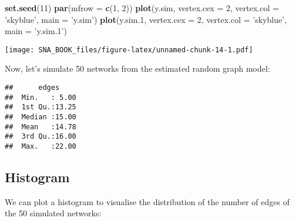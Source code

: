 \documentclass[]{book}
\newenvironment{Shaded}{\begin{snugshade}}{\end{snugshade}}
\newcommand{\KeywordTok}[1]{\textcolor[rgb]{0.13,0.29,0.53}{\textbf{{#1}}}}
\newcommand{\DataTypeTok}[1]{\textcolor[rgb]{0.13,0.29,0.53}{{#1}}}
\newcommand{\DecValTok}[1]{\textcolor[rgb]{0.00,0.00,0.81}{{#1}}}
\newcommand{\FloatTok}[1]{\textcolor[rgb]{0.00,0.00,0.81}{{#1}}}
\newcommand{\StringTok}[1]{\textcolor[rgb]{0.31,0.60,0.02}{{#1}}}
\newcommand{\CommentTok}[1]{\textcolor[rgb]{0.56,0.35,0.01}{\textit{{#1}}}}
\newcommand{\OtherTok}[1]{\textcolor[rgb]{0.56,0.35,0.01}{{#1}}}
\newcommand{\NormalTok}[1]{{#1}}
\begin{document}
\begin{Shaded}
\begin{Highlighting}[]
\KeywordTok{set.seed}\NormalTok{(}\DecValTok{11}\NormalTok{)}
\KeywordTok{par}\NormalTok{(}\DataTypeTok{mfrow =} \KeywordTok{c}\NormalTok{(}\DecValTok{1}\NormalTok{, }\DecValTok{2}\NormalTok{))}
\KeywordTok{plot}\NormalTok{(y.sim, }\DataTypeTok{vertex.cex =} \DecValTok{2}\NormalTok{, }\DataTypeTok{vertex.col =} \StringTok{'skyblue'}\NormalTok{, }\DataTypeTok{main =} \StringTok{'y.sim'}\NormalTok{)}
\KeywordTok{plot}\NormalTok{(y.sim}\FloatTok{.1}\NormalTok{, }\DataTypeTok{vertex.cex =} \DecValTok{2}\NormalTok{, }\DataTypeTok{vertex.col =} \StringTok{'skyblue'}\NormalTok{, }\DataTypeTok{main =} \StringTok{'y.sim.1'}\NormalTok{)}
\end{Highlighting}
\end{Shaded}

\texttt{[image: SNA\_BOOK\_files/figure-latex/unnamed-chunk-14-1.pdf]}

Now, let's simulate 50 networks from the estimated random graph model:

\begin{Shaded}
\end{Shaded}

\begin{verbatim}
##      edges      
##  Min.   : 5.00  
##  1st Qu.:13.25  
##  Median :15.00  
##  Mean   :14.78  
##  3rd Qu.:16.00  
##  Max.   :22.00
\end{verbatim}

\subsection{Histogram}\label{histogram}

We can plot a histogram to visualise the distribution of the number of
edges of the 50 simulated networks:
\end{document}
